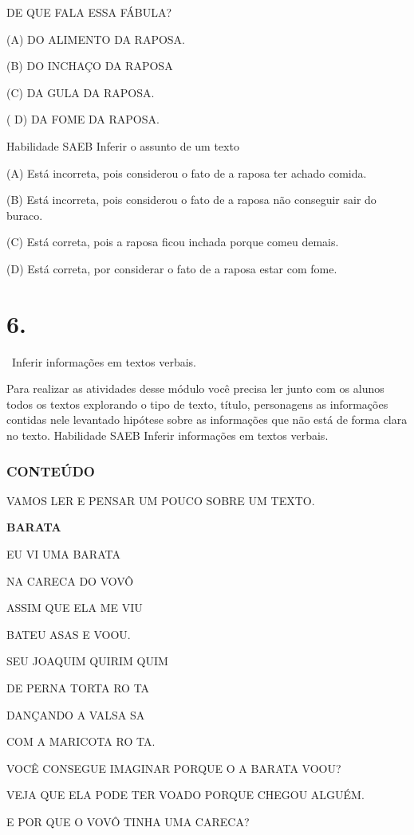 {{DE QUE FALA ESSA FÁBULA?

(A) DO ALIMENTO DA RAPOSA.

(B) DO INCHAÇO DA RAPOSA

(C) DA GULA DA RAPOSA.

( D) DA FOME DA RAPOSA.

Habilidade SAEB Inferir o assunto de um texto

(A) Está incorreta, pois considerou o fato de a raposa ter achado
comida.

(B) Está incorreta, pois considerou o fato de a raposa não conseguir
sair do buraco.

(C) Está correta, pois a raposa ficou inchada porque comeu demais.

(D) Está correta, por considerar o fato de a raposa estar com fome.

\chapter{6.}

~Inferir informações em textos verbais.

Para realizar as atividades desse módulo você precisa ler junto com os
alunos todos os textos explorando o tipo de texto, título, personagens
as informações contidas nele levantado hipótese sobre as informações que
não está de forma clara no texto. Habilidade SAEB Inferir informações em
textos verbais.

\subsection{CONTEÚDO}

VAMOS LER E PENSAR UM POUCO SOBRE UM TEXTO.

\textbf{BARATA}

EU VI UMA BARATA

NA CARECA DO VOVÔ

ASSIM QUE ELA ME VIU

BATEU ASAS E VOOU.

SEU JOAQUIM QUIRIM QUIM

DE PERNA TORTA RO TA

DANÇANDO A VALSA SA

COM A MARICOTA RO TA.

VOCÊ CONSEGUE IMAGINAR PORQUE O A BARATA VOOU?

VEJA QUE ELA PODE TER VOADO PORQUE CHEGOU ALGUÉM.

E POR QUE O VOVÔ TINHA UMA CARECA?

}}
